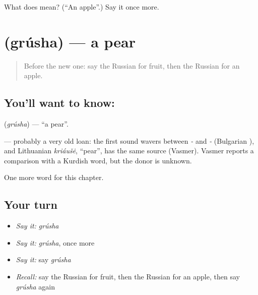 \begin{tcolorbox}[breakable,colback=teal!4,colframe=teal!35!black,title={Before you move on}]
What does  mean? (\textquotedblleft{}An apple\textquotedblright{}.) Say it once more.
\end{tcolorbox}
\section[\texorpdfstring{\ru{груша} (grúsha)}{груша (grúsha)}]{ (grúsha) — a pear}

\label{lesson:RU-C44-pear}



\begin{quote}
Before the new one: say the Russian for fruit, then the Russian for an apple.
\end{quote}

\subsection*{You'll want to know: }
\textbf{} (\emph{grúsha}) — \textquotedblleft{}a pear\textquotedblright{}.

\begin{cousinweb}
\textbf{} — probably a very old loan: the first sound wavers between \emph{-} and \emph{-} (Bulgarian \emph{}), and Lithuanian \emph{kriáušė}, \textquotedblleft{}pear\textquotedblright{}, has the same source (Vasmer). Vasmer reports a comparison with a Kurdish word, but the donor is unknown.
\end{cousinweb}

\begin{grammarlens}[title={What you've built}]
One more word for this chapter.
\end{grammarlens}

\subsection*{Your turn}
\begin{itemize}
\raggedright
  \item \emph{Say it:} \emph{grúsha}
  \item \emph{Say it:} \emph{grúsha}, once more
  \item \emph{Say it:} say \emph{grúsha}
  \item \emph{Recall:} say the Russian for fruit, then the Russian for an apple, then say \emph{grúsha} again
\end{itemize}

